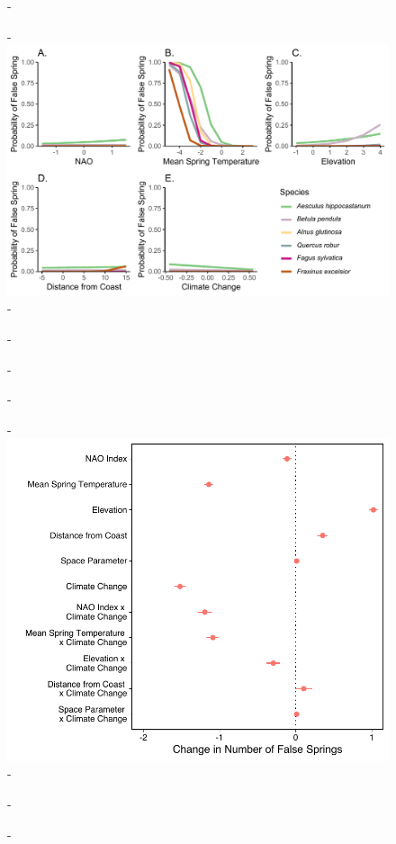 \documentclass{article}\usepackage[]{graphicx}\usepackage[]{color}
\begin{document}
{\begin{figure} [H]
  -\begin{center}
  -\includegraphics[width=16cm]{..//figures/InteractionPlots/Species_dvr.pdf}
  -\caption{}\label{fig:spp}
  -\end{center}
  -\end{figure}}

  
{\begin{figure} [H]
  -\begin{center}
  -\includegraphics[width=16cm]{..//figures/model_output_bern.pdf}
  -\caption{}\label{fig:five}
  -\end{center}
  -\end{figure}}
\end{document}
